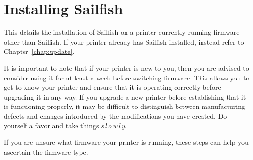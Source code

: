 
\chapter{Installing Sailfish} \label{chap:install}

This details the installation of Sailfish on a printer currently running \gls{firmware} other than Sailfish.  If your printer already has Sailfish installed, instead refer to Chapter~\ref{chap:update}.

It is important to note that if your printer is new to you, then you are advised to consider using it for at least a week before switching firmware.  This allows you to get to know your printer and ensure that it is operating correctly before upgrading it in any way.  If you upgrade a new printer before establishing that it is functioning properly, it may be difficult to distinguish between manufacturing defects and changes introduced by the modifications you have created.  Do yourself a favor and take things \textsl{s\,l\,o\,w\,l\,y}.

If you are unsure what firmware your printer is running, these steps can help you ascertain the firmware type.

